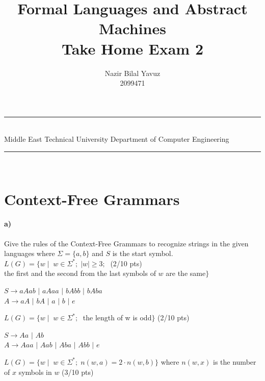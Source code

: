 \documentclass[a4paper,12pt]{article}
\title{Formal Languages and Abstract Machines \\ Take Home Exam 2}
\author{Nazir Bilal Yavuz \\ 2099471} %
\date{} %
\newcommand{\HRule}{\rule{\linewidth}{1mm}}
\begin{document}
\HRule\\
Middle East Technical University \hfill Department of Computer Engineering
{\let\newpage\relax\maketitle}
\HRule\\
\vspace{1cm}


\section{Context-Free Grammars \hfill {}}

\paragraph{a)} Give the rules of the Context-Free Grammars to recognize strings in the given languages where $\Sigma=\{a,b\}$ and $S$ is the start symbol. \\  

$L(G)=\{w \mid \;  w \in \Sigma^*;\; |w| \geq 3;\; $  \hfill \small{(2/10 pts)} \\
\hspace*{22mm} the first and the second from the last symbols of $w$ are the same$\}$ \\

\begin{tcolorbox}

$ S\rightarrow aAab$ $|$ $aAaa$ $|$ $bAbb$ $|$ $bAba$\\
$ A\rightarrow aA$ $|$ $bA$ $|$ $a$ $|$ $b$ $|$ $e$  

\end{tcolorbox}


$L(G)=\{w \mid \;  w \in \Sigma^*;\; $ the length of w is odd$\}$ \hfill \small{(2/10 pts)} \\

\begin{tcolorbox}

$ S\rightarrow Aa$ $|$ $Ab$ \\
$ A\rightarrow Aaa$ $|$ $Aab$ $|$ $Aba$ $|$ $Abb$ $|$ $e$ 

\end{tcolorbox}


$L(G)=\{w \mid \;  w \in \Sigma^*;\; n(w,a)=2\cdot n(w,b)\}$ where $n(w,x)$ is the number of $x$ symbols in $w$ \hfill \small{(3/10 pts)} \\
\end{document}
